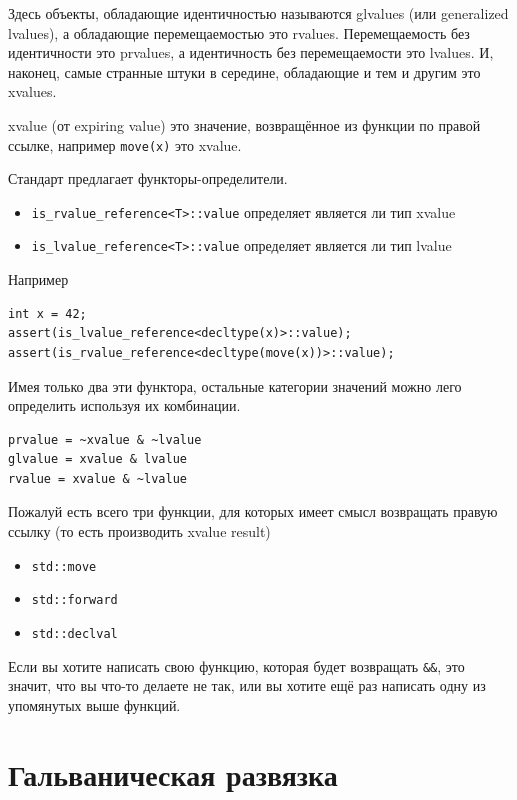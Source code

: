 \documentclass[a4paper,12pt,oneside]{book}
\newif\ifgalvanic
\begin{document}
Здесь объекты, обладающие идентичностью называются glvalues (или generalized lvalues), а обладающие  перемещаемостью это rvalues. Перемещаемость без идентичности это prvalues, а идентичность без перемещаемости это lvalues. И, наконец, самые странные штуки в середине, обладающие и тем и другим это xvalues.

xvalue (от expiring value) это значение, возвращённое из функции по правой ссылке, например \lstinline!move(x)! это xvalue.

Стандарт предлагает функторы-определители.

\begin{itemize}
\item \lstinline!is_rvalue_reference<T>::value! определяет является ли  тип xvalue
\item \lstinline!is_lvalue_reference<T>::value! определяет является ли тип lvalue
\end{itemize}

Например

\begin{lstlisting}
int x = 42;
assert(is_lvalue_reference<decltype(x)>::value);
assert(is_rvalue_reference<decltype(move(x))>::value);
\end{lstlisting}

Имея только два эти функтора, остальные категории значений можно лего определить используя их комбинации.

\begin{verbatim}
prvalue = ~xvalue & ~lvalue
glvalue = xvalue & lvalue
rvalue = xvalue & ~lvalue
\end{verbatim}

Пожалуй есть всего три функции, для которых имеет смысл возвращать правую ссылку (то есть производить xvalue result)

\begin{itemize}
\item \lstinline!std::move!
\item \lstinline!std::forward!
\item \lstinline!std::declval!
\end{itemize}

Если вы хотите написать свою функцию, которая будет возвращать \lstinline!&&!, это значит, что вы что-то делаете не так, или вы хотите ещё раз написать одну из упомянутых выше функций.

\ifgalvanic
\pagebreak
\section{Гальваническая развязка}\label{PImpl}
\end{document}
